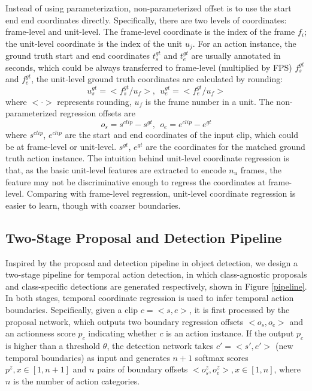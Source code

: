 \documentclass{bmvc2k}
\begin{document}
Instead of using parameterization, non-parameterized offset is to use the start end end coordinates directly. Specifically, there are two levels of coordinates: frame-level and unit-level. The frame-level coordinate is the index of the frame $f_i$; the unit-level coordinate is the index of the unit $u_j$. For an action instance, the ground truth start and end coordinates $t^{gt}_s$ and $t^{gt}_e$ are usually annotated in seconds, which could be always transferred to frame-level (multiplied by FPS) $f^{gt}_s$ and $f^{gt}_e$, the unit-level ground truth coordinates are calculated by rounding:
\begin{equation}
u^{gt}_s=<f^{gt}_s/u_f>, ~~u^{gt}_e=<f^{gt}_e/u_f>
\end{equation}
where $<\cdot>$ represents rounding, $u_f$ is the frame number in a unit. The non-parameterized regression offsets are
\begin{equation}
o_s=s^{clip}-s^{gt}, ~~ o_e=e^{clip}-e^{gt}
\end{equation}
where $s^{clip}$, $e^{clip}$ are the start and end coordinates of the input clip, which could be at frame-level or unit-level. $s^{gt}$, $e^{gt}$ are the coordinates for the matched ground truth action instance. The intuition behind unit-level coordinate regression is that, as the basic unit-level features are extracted to encode $n_u$ frames, the feature may not be discriminative enough to regress the coordinates at frame-level. Comparing with frame-level regression, unit-level coordinate regression is easier to learn, though with coarser boundaries. 


\subsection{Two-Stage Proposal and Detection Pipeline}

Inspired by the proposal and detection pipeline in object detection, we design a two-stage pipeline for temporal action detection, in which class-agnostic proposals  and class-specific detections are generated respectively, shown in Figure \ref{pipeline}. In both stages, temporal coordinate regression is used to infer temporal action boundaries. Sepcifically, given a clip $c=<s,e>$, it is first processed by the proposal network, which outputs two boundary regression offsets $<o_{s},o_{e}>$ and an actionness score $p_{c}$ indicating whether $c$ is an action instance. If the output $p_{c}$ is higher than a threshold $\theta$, the detection network takes $c'=<s',e'>$ (new temporal boundaries) as input and generates $n+1$ softmax scores  $p^z,x\in[1,n+1]$ and $n$ pairs of boundary offsets $<o^z_{s},o^z_{e}>, x\in [1,n]$, where $n$ is the number of action categories. 
\end{document}
